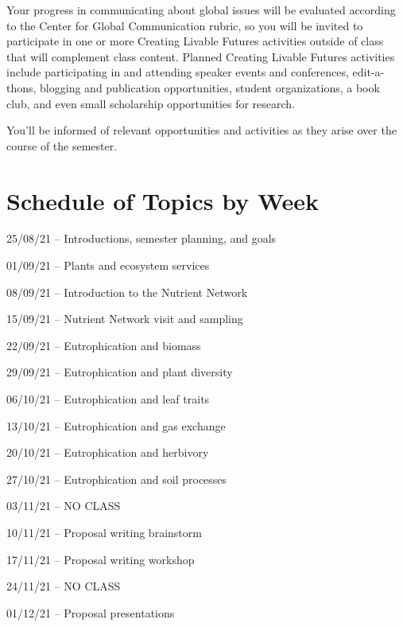 \documentclass[12pt, notitlepage]{article}   	%
\begin{document}
{Your progress in communicating about global issues will be evaluated according to the 
Center for Global Communication rubric, so you will be invited to participate 
in one or more Creating Livable Futures activities outside of class that will 
complement class content. 
Planned Creating Livable Futures activities include participating in and attending 
speaker events and conferences, edit-a-thons, blogging and publication opportunities, 
student organizations, a book club, and even small scholarship opportunities for research. 

You’ll be informed of relevant opportunities and activities as they arise over 
the course of the semester.

\newpage

\section*{Schedule of Topics by Week}
25/08/21 – Introductions, semester planning, and goals \par
01/09/21 – Plants and ecosystem services \par
08/09/21 – Introduction to the Nutrient Network \par
15/09/21 – Nutrient Network visit and sampling \par
22/09/21 – Eutrophication and biomass \par
29/09/21 – Eutrophication and plant diversity \par
06/10/21 – Eutrophication and leaf traits \par
13/10/21 – Eutrophication and gas exchange \par
20/10/21 – Eutrophication and herbivory \par
27/10/21 – Eutrophication and soil processes \par
03/11/21 – NO CLASS \par
10/11/21 – Proposal writing brainstorm \par
17/11/21 – Proposal writing workshop \par
24/11/21 – NO CLASS \par
01/12/21 – Proposal presentations \par

} %
\end{document}
